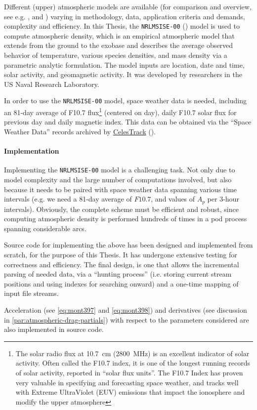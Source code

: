 Different (upper) atmospheric models are available (for comparison and overview, 
see e.g. \cite{Doornbos2009}, \cite{Yang2022} and \cite{Vallado2014}) varying in 
methodology, data, application criteria and demands, complexity and efficiency. 
In this Thesis, the \texttt{NRLMSISE-00} (\cite{nrlmsise00}) model is used  
to compute atmospheric density, which is an empirical atmospheric model that 
extends from the ground to the exobase and describes the average observed behavior 
of temperature, various species densities, and mass density via a parametric 
analytic formulation. The model inputs are location, date and time, solar activity, 
and geomagnetic activity. It was developed by researchers in the US Naval Research 
Laboratory.

In order to use the \texttt{NRLMSISE-00} model, space weather data is needed, including 
an 81-day average of F10.7 flux\footnote{The solar radio flux at \SI{10.7}{\cm} (\SI{2800}{\MHz}) 
is an excellent indicator of solar activity. Often called the F10.7 index, it is 
one of the longest running records of solar activity, reported in ``solar flux units''. 
The F10.7 Index has proven very valuable in specifying and forecasting space weather, 
and tracks well with Extreme UltraViolet (EUV) emissions that impact the ionosphere 
and modify the upper atmosphere} (centered on day), daily F10.7 solar flux for previous 
day and daily magnetic index. This data can be obtained via the ``Space Weather Data'' 
records archived by \href{https://celestrak.org/}{CelesTrack} (\cite{Vallado2013}).

\paragraph{Implementation}\label{par:atmospheric-drag-implementation}

Implementing the \texttt{NRLMSISE-00} model is a challenging task. Not only due to
model complexity and the large number of computations involved, but also because 
it needs to be paired with space weather data spanning various time intervals 
(e.g. we need a 81-day average of $F10.7$, and values of $A_p$ per 3-hour intervals). 
Obviously, the complete scheme must be efficient and robust, since computing atmospheric 
density is performed hundreds of times in a \gls{pod} process spanning considerable 
arcs.

Source code for implementing the above has been designed and implemented from 
scratch, for the purpose of this Thesis. It has undergone extensive testing for 
correctness and efficiency. The final design, is one that allows the incremental 
parsing of needed data, via a ``hunting process'' (i.e. storing current stream 
positions and using indexes for searching onward) and a one-time mapping of 
input file streams.

Acceleration (see \autoref{eq:mont397} and \autoref{eq:mont398}) and derivatives 
(see discussion in \autoref{par:atmospheric-drag-partials}) with respect to the 
parameters considered are also implemented in source code.

